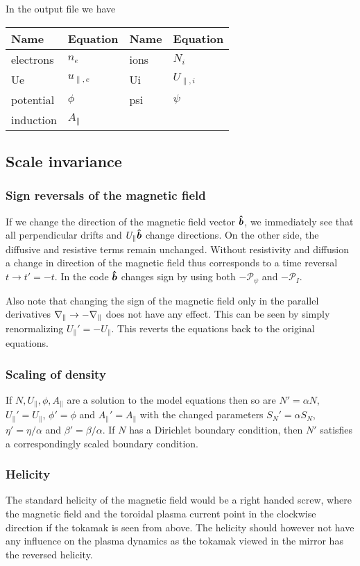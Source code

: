 In the output file we have
\begin{longtable}{llll}
\toprule
\rowcolor{gray!50}\textbf{Name} &  \textbf{Equation} & \textbf{Name} &  \textbf{Equation}\\
\midrule
    electrons &$n_e$ &
    ions &$N_i$ \\
    Ue &$u_{\parallel,e}$ &
    Ui &$U_{\parallel,i}$ \\
    potential &$\phi$ &
    psi &$\psi$ \\
    induction &$A_\parallel$ & \\
\bottomrule
\end{longtable}
\subsection{ Scale invariance}
\subsubsection{Sign reversals of the magnetic field}\label{sec:field_reversal}
If we change the direction of the magnetic field vector $\bm{\hat{b}}$, we immediately see that all perpendicular
drifts and $U_\parallel\bm{\hat{b}}$ change directions. On the other side, the diffusive and resistive terms remain unchanged.
Without resistivity and diffusion a change in direction of the magnetic field thus corresponds to
a time reversal $t\rightarrow t'=-t$.
In the code $\bm{\hat{b}}$ changes sign by using both $-\mathcal P_\psi$ and $-\mathcal P_I$.

Also note that changing the sign of the magnetic field only in the parallel derivatives $\nabla_\parallel \rightarrow -\nabla_\parallel$ does not
have any effect. This can be seen by simply renormalizing $U_\parallel'=-U_\parallel$. This reverts the equations back to the original equations.
\subsubsection{Scaling of density}
If $N, U_\parallel, \phi, A_\parallel$ are a solution to the model equations
then so are $N'=\alpha N$, $U_\parallel'=U_\parallel$, $\phi'=\phi$ and $A_\parallel'=A_\parallel$ with the changed parameters $S_N' = \alpha S_N$, $\eta' = \eta/\alpha$ and $ \beta' = \beta/\alpha$. If $N$
has a Dirichlet boundary condition, then $N'$ satisfies a correspondingly scaled boundary condition.
\subsubsection{Helicity}
The standard helicity of the magnetic field would be a right handed screw,
where the magnetic field and the toroidal plasma current point in the clockwise
direction if the tokamak is seen from above.
The helicity should however not have any influence on the plasma dynamics as
the tokamak viewed in the mirror has the reversed helicity.

